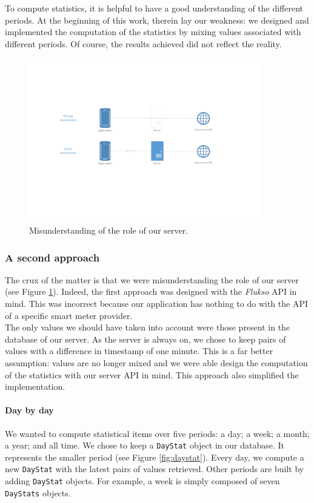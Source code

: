 \documentclass[a4paper, oneside, 11pt]{book}
\begin{document}
To compute statistics, it is helpful to have a good understanding of the different periods. At the beginning of this work, therein lay our weakness: we designed and implemented the computation of the statistics by mixing values associated with different periods. Of course, the results achieved did not reflect the reality.

\begin{figure}[htbp]
	\centerline{\includegraphics[width=0.9\textwidth]{assumption.pdf}}
	\caption{Misunderstanding of the role of our server.}
	\label{fig:assumption}
\end{figure}

\subsubsection{A second approach}
The crux of the matter is that we were misunderstanding the role of our server (see Figure \ref{fig:assumption}). Indeed, the first approach was designed with the \textit{Flukso} API in mind. This was incorrect because our application has nothing to do with the API of a specific smart meter provider. \\

The only values we should have taken into account were those present in the database of our server. As the server is always on, we chose to keep pairs of values with a difference in timestamp of one minute. This is a far better assumption:  values are no longer mixed and we were able design the computation of the statistics with our server API in mind. This approach also simplified the implementation.

\paragraph{Day by day}
We wanted to compute statistical items over five periods: a day; a week; a month; a year; and all time. We chose to keep a \texttt{DayStat} object in our database. It represents the smaller period (see Figure \ref{fig:daystat}). Every day, we compute a new \texttt{DayStat} with the latest pairs of values retrieved. Other periods are built by adding \texttt{DayStat} objects. For example, a week is simply composed of seven \texttt{DayStats} objects.
\end{document}
